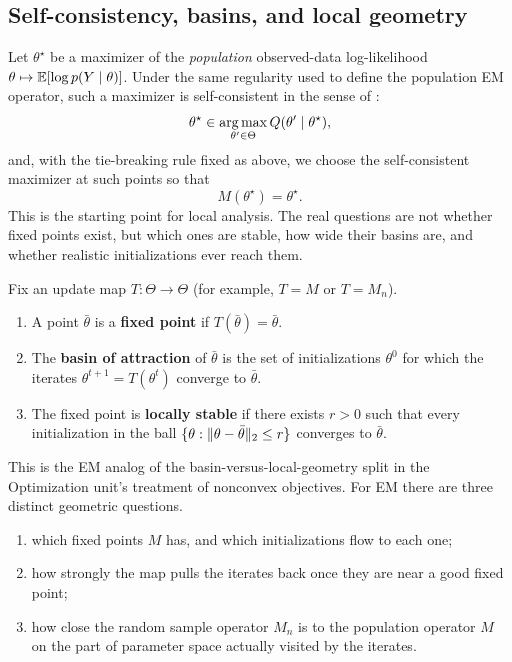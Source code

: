 \documentclass[11pt]{article}
\begin{document}
\subsection{Self-consistency, basins, and local geometry}
\label{subsec:em-self-consistency}

Let $\theta^\star$ be a maximizer of the \emph{population} observed-data log-likelihood $\theta\mapsto \mathbb{E}[\log p(Y\mid\theta)]$.
Under the same regularity used to define the population EM operator, such a maximizer is self-consistent in the sense of \citet[eq.~(24)]{balakrishnan_wainwright_yu_2014_em}:
\[
\theta^\star \in \operatorname*{arg\,max}_{\theta'\in\Theta} Q(\theta' \mid \theta^\star),
\]
and, with the tie-breaking rule fixed as above, we choose the self-consistent maximizer at such points so that
\[
M(\theta^\star)=\theta^\star.
\]
This is the starting point for local analysis.
The real questions are not whether fixed points exist, but which ones are stable, how wide their basins are, and whether realistic initializations ever reach them.

\begin{definition}
\label{def:em-basins}
Fix an update map $T:\Theta\to\Theta$ (for example, $T=M$ or $T=M_n$).
\begin{enumerate}[leftmargin=*]
  \item A point $\bar\theta$ is a \textbf{fixed point} if $T(\bar\theta)=\bar\theta$.
  \item The \textbf{basin of attraction} of $\bar\theta$ is the set of initializations $\theta^0$ for which the iterates $\theta^{t+1}=T(\theta^t)$ converge to $\bar\theta$.
  \item The fixed point is \textbf{locally stable} if there exists $r>0$ such that every initialization in the ball $\{\theta:\lVert\theta-\bar\theta\rVert_2\le r\}$ converges to $\bar\theta$.
\end{enumerate}
\end{definition}

This is the EM analog of the basin-versus-local-geometry split in the Optimization unit's treatment of nonconvex objectives.
For EM there are three distinct geometric questions.
\begin{enumerate}[leftmargin=*]
  \item which fixed points $M$ has, and which initializations flow to each one;
  \item how strongly the map pulls the iterates back once they are near a good fixed point;
  \item how close the random sample operator $M_n$ is to the population operator $M$ on the part of parameter space actually visited by the iterates.
\end{enumerate}
\end{document}
